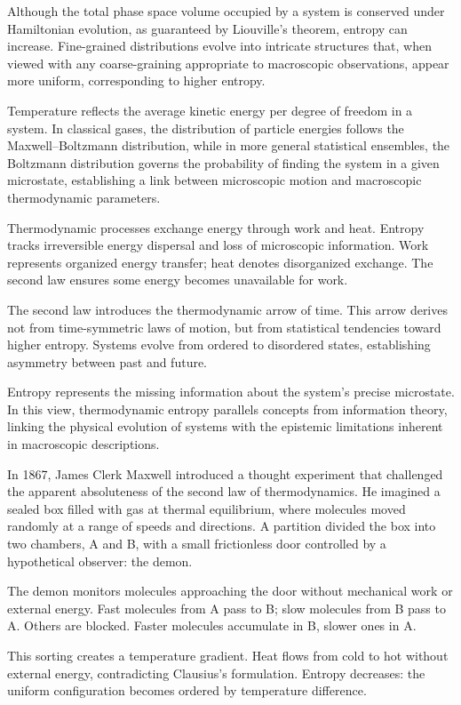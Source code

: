 Although the total phase space volume occupied by a system is conserved under Hamiltonian evolution, as guaranteed by Liouville's theorem, entropy can increase. Fine-grained distributions evolve into intricate structures that, when viewed with any coarse-graining appropriate to macroscopic observations, appear more uniform, corresponding to higher entropy.

Temperature reflects the average kinetic energy per degree of freedom in a system. In classical gases, the distribution of particle energies follows the Maxwell–Boltzmann distribution, while in more general statistical ensembles, the Boltzmann distribution governs the probability of finding the system in a given microstate, establishing a link between microscopic motion and macroscopic thermodynamic parameters.

Thermodynamic processes exchange energy through work and heat. Entropy tracks irreversible energy dispersal and loss of microscopic information. Work represents organized energy transfer; heat denotes disorganized exchange. The second law ensures some energy becomes unavailable for work.

The second law introduces the thermodynamic arrow of time. This arrow derives not from time-symmetric laws of motion, but from statistical tendencies toward higher entropy. Systems evolve from ordered to disordered states, establishing asymmetry between past and future.

Entropy represents the missing information about the system's precise microstate. In this view, thermodynamic entropy parallels concepts from information theory, linking the physical evolution of systems with the epistemic limitations inherent in macroscopic descriptions.

In 1867, James Clerk Maxwell introduced a thought experiment that challenged the apparent absoluteness of the second law of thermodynamics. He imagined a sealed box filled with gas at thermal equilibrium, where molecules moved randomly at a range of speeds and directions. A partition divided the box into two chambers, A and B, with a small frictionless door controlled by a hypothetical observer: the demon.

The demon monitors molecules approaching the door without mechanical work or external energy. Fast molecules from A pass to B; slow molecules from B pass to A. Others are blocked. Faster molecules accumulate in B, slower ones in A.

This sorting creates a temperature gradient. Heat flows from cold to hot without external energy, contradicting Clausius's formulation. Entropy decreases: the uniform configuration becomes ordered by temperature difference.

